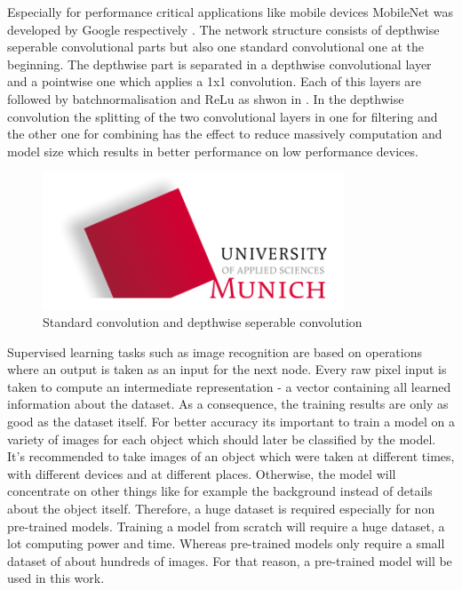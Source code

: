 Especially for performance critical applications like mobile devices MobileNet was developed by Google respectively \citet{Howard2017}.
The network structure consists of depthwise seperable convolutional parts but also one standard convolutional one at the beginning. The depthwise part is separated in a depthwise convolutional layer and a pointwise one which applies a 1x1 convolution. Each of this layers are followed by batchnormalisation and ReLu as shwon in . In the depthwise convolution the splitting of the two convolutional layers in one for filtering and the other one for combining has the effect to reduce massively computation and model size which results in better performance on low performance devices.

\begin{figure}[htbp]
\includegraphics[width=0.8\textwidth]{includes/MUASlogo}
\caption[Standard convolution and depthwise seperable convolution]{Standard convolution and depthwise seperable convolution \citep{Howard2017}}
\label{fig:FH-Logo7}
\end{figure}
 		
Supervised learning tasks such as image recognition are based on operations where an output is taken as an input for the next node. Every raw pixel input is taken to compute an intermediate representation - a vector containing all learned information about the dataset. As a consequence, the training results are only as good as the dataset itself. For better accuracy its important to train a model on a variety of images for each object which should later be classified by the model. It's recommended to take images of an object which were taken at different times, with different devices and at different places. Otherwise, the model will concentrate on other things like for example the background instead of details about the object itself. Therefore, a huge dataset is required especially for non pre-trained models. Training a model from scratch will require a huge dataset, a lot computing power and time. Whereas pre-trained models only require a small dataset of about hundreds of images. For that reason, a pre-trained model will be used in this work.